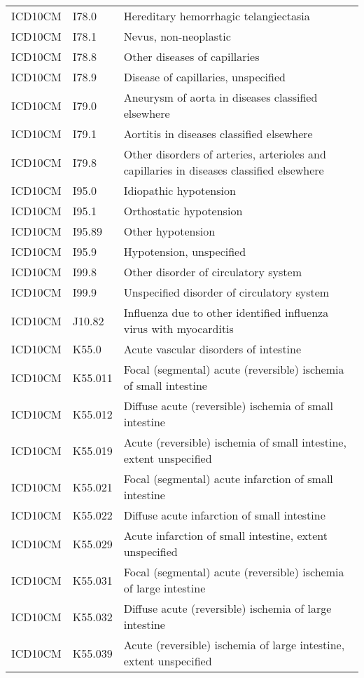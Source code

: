 \begin{longtable}{p{}p{}p{}}
  ICD10CM & I78.0 & Hereditary hemorrhagic telangiectasia \\ 
  ICD10CM & I78.1 & Nevus, non-neoplastic \\ 
  ICD10CM & I78.8 & Other diseases of capillaries \\ 
  ICD10CM & I78.9 & Disease of capillaries, unspecified \\ 
  ICD10CM & I79.0 & Aneurysm of aorta in diseases classified elsewhere \\ 
  ICD10CM & I79.1 & Aortitis in diseases classified elsewhere \\ 
  ICD10CM & I79.8 & Other disorders of arteries, arterioles and capillaries in diseases classified elsewhere \\ 
  ICD10CM & I95.0 & Idiopathic hypotension \\ 
  ICD10CM & I95.1 & Orthostatic hypotension \\ 
  ICD10CM & I95.89 & Other hypotension \\ 
  ICD10CM & I95.9 & Hypotension, unspecified \\ 
  ICD10CM & I99.8 & Other disorder of circulatory system \\ 
  ICD10CM & I99.9 & Unspecified disorder of circulatory system \\ 
  ICD10CM & J10.82 & Influenza due to other identified influenza virus with myocarditis \\ 
  ICD10CM & K55.0 & Acute vascular disorders of intestine \\ 
  ICD10CM & K55.011 & Focal (segmental) acute (reversible) ischemia of small intestine \\ 
  ICD10CM & K55.012 & Diffuse acute (reversible) ischemia of small intestine \\ 
  ICD10CM & K55.019 & Acute (reversible) ischemia of small intestine, extent unspecified \\ 
  ICD10CM & K55.021 & Focal (segmental) acute infarction of small intestine \\ 
  ICD10CM & K55.022 & Diffuse acute infarction of small intestine \\ 
  ICD10CM & K55.029 & Acute infarction of small intestine, extent unspecified \\ 
  ICD10CM & K55.031 & Focal (segmental) acute (reversible) ischemia of large intestine \\ 
  ICD10CM & K55.032 & Diffuse acute (reversible) ischemia of large intestine \\ 
  ICD10CM & K55.039 & Acute (reversible) ischemia of large intestine, extent unspecified \\ 

\end{longtable}
